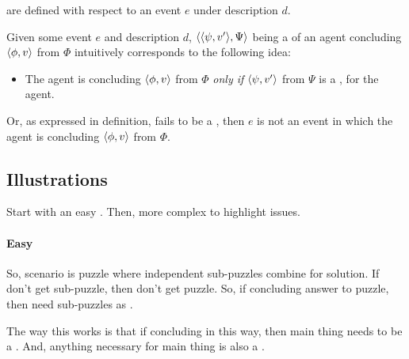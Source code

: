 \begin{note}
   are defined with respect to an event \(e\) under description \(d\).

  Given some event \(e\) and description \(d\), \(\langle \langle \psi, v' \rangle, \Psi \rangle\) being a \requ{} of an agent concluding \(\langle \phi, v \rangle\) from \(\Phi\) intuitively corresponds to the following idea:
  \begin{itemize}
  \item
    The agent is concluding \(\langle \phi, v \rangle\) from \(\Phi\) \emph{only if} \(\langle \psi, v' \rangle\) from \(\Psi\) is a \fc{}, for the agent.
  \end{itemize}

  Or, as expressed in definition, fails to be a \fc{}, then \(e\) is not an event in which the agent is concluding \(\langle \phi, v \rangle\) from \(\Phi\).
\end{note}

\subsection{Illustrations}
\label{cha:requs:firstIllu}

\begin{note}
  Start with an easy .
  Then, more complex to highlight issues.
\end{note}

\paragraph{Easy}

\begin{note}
  So, scenario is puzzle where independent sub-puzzles combine for solution.
  If don't get sub-puzzle, then don't get puzzle.
  So, if concluding answer to puzzle, then need sub-puzzles as .

  The way this works is that if concluding in this way, then main thing needs to be a \fc{}.
  And, anything necessary for main thing is also a \fc{}.
\end{note}

